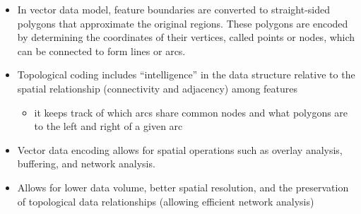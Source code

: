 \documentclass[11pt,dvipsnames,ignorenonframetext,aspectratio=169]{beamer}
\providecommand{\tightlist}{%
  \setlength{\itemsep}{0pt}\setlength{\parskip}{0pt}}
\begin{document}
\begin{frame}{}
\protect\hypertarget{section-3}{}
\begin{itemize}
\tightlist
\item
  In vector data model, feature boundaries are converted to
  straight-sided polygons that approximate the original regions. These
  polygons are encoded by determining the coordinates of their vertices,
  called points or nodes, which can be connected to form lines or arcs.
\item
  Topological coding includes ``intelligence'' in the data structure
  relative to the spatial relationship (connectivity and adjacency)
  among features

  \begin{itemize}
  \tightlist
  \item
    it keeps track of which arcs share common nodes and what polygons
    are to the left and right of a given arc
  \end{itemize}
\item
  Vector data encoding allows for spatial operations such as overlay
  analysis, buffering, and network analysis.
\item
  Allows for lower data volume, better spatial resolution, and the
  preservation of topological data relationships (allowing efficient
  network analysis)
\end{itemize}
\end{frame}
\end{document}
